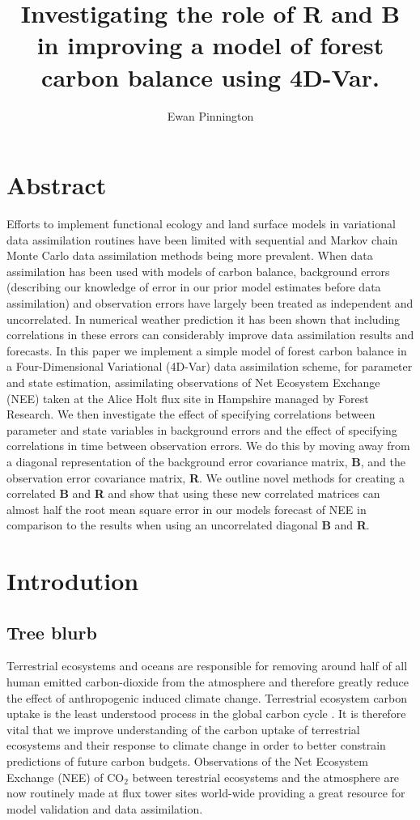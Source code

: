 \documentclass[11pt]{article}
\title{Investigating the role of \textbf{R} and \textbf{B} in improving a model of forest carbon balance using 4D-Var.}
\author{Ewan Pinnington}
\begin{document}
\maketitle

\section*{Abstract}

Efforts to implement functional ecology and land surface models in variational data assimilation routines have been limited with sequential and Markov chain Monte Carlo data assimilation methods being more prevalent. When data assimilation has been used with models of carbon balance, background errors (describing our knowledge of error in our prior model estimates before data assimilation) and observation errors have largely been treated as independent and uncorrelated. In numerical weather prediction it has been shown that including correlations in these errors can considerably improve data assimilation results and forecasts. In this paper we implement a simple model of forest carbon balance in a Four-Dimensional Variational (4D-Var) data assimilation scheme, for parameter and state estimation, assimilating observations of Net Ecosystem Exchange (NEE) taken at the Alice Holt flux site in Hampshire managed by Forest Research. We then investigate the effect of specifying correlations between parameter and state variables in background errors and the effect of specifying correlations in time between observation errors. We do this by moving away from a diagonal representation of the background error covariance matrix, \textbf{B}, and the observation error covariance matrix, \textbf{R}. We outline novel methods for creating a correlated \textbf{B} and \textbf{R} and show that using these new correlated matrices can almost half the root mean square error in our models forecast of NEE in comparison to the results when using an uncorrelated diagonal \textbf{B} and \textbf{R}.      

\section{Introdution}

\subsection{Tree blurb}
Terrestrial ecosystems and oceans are responsible for removing around half of all human emitted carbon-dioxide from the atmosphere and therefore greatly reduce the effect of anthropogenic induced climate change. Terrestrial ecosystem carbon uptake is the least understood process in the global carbon cycle \citep{ciais2014carbon}. It is therefore vital that we improve understanding of the carbon uptake of terrestrial ecosystems and their response to climate change in order to better constrain predictions of future carbon budgets. Observations of the Net Ecosystem Exchange (NEE) of CO$_{2}$ between terestrial ecosystems and the atmosphere are now routinely made at flux tower sites world-wide \citep{baldocchi2008turner} providing a great resource for model validation and data assimilation.
\end{document}
